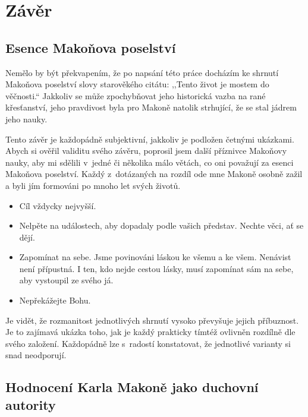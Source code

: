 \chapter{Závěr}

\section{Esence Makoňova poselství}

Nemělo by být překvapením, že po napsání této práce docházím ke shrnutí Makoňova
poselství slovy starověkého citátu: ,,Tento život je mostem do věčnosti.``
Jakkoliv se může zpochybňovat jeho historická vazba na rané
křesťanství\cite{dus2001neznama}, jeho pravdivost byla pro Makoně natolik
strhující, že se stal jádrem jeho nauky.

Tento závěr je každopádně subjektivní, jakkoliv je podložen četnými ukázkami.
Abych si ověřil validitu svého závěru, poprosil jsem další příznivce Makoňovy
nauky, aby mi sdělili v~jedné či několika málo větách, co oni považují za esenci
Makoňova poselství. Každý z~dotázaných na rozdíl ode mne Makoně osobně zažil a
byli jím formováni po mnoho let svých životů.

\begin{itemize}
\item{Cíl vždycky nejvyšší.}
\item{Nelpěte na událostech, aby dopadaly podle vašich představ. Nechte věci, ať
  se dějí.}
\item{Zapomínat na sebe. Jsme povinováni láskou ke všemu a ke všem. Nenávist
  není přípustná. I ten, kdo nejde cestou lásky, musí zapomínat sám na sebe, aby
    vystoupil ze svého já.}
\item{Nepřekážejte Bohu.}
\end{itemize}

Je vidět, že rozmanitost jednotlivých shrnutí vysoko převyšuje jejich
příbuznost. Je to zajímavá ukázka toho, jak je každý prakticky tímtéž ovlivněn
rozdílně dle svého založení. Každopádně lze s~radostí konstatovat, že jednotlivé
varianty si snad neodporují.

\section{Hodnocení Karla Makoně jako duchovní autority}

